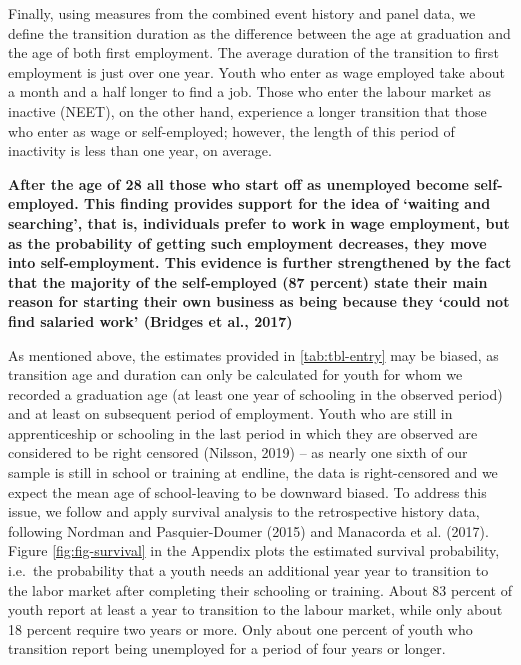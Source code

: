 \documentclass[
  11pt,
a4paper
]{article}
\begin{document}
Finally, using measures from the combined event history and panel data, we define the transition duration as the difference between the age at graduation and the age of both first employment. The average duration of the transition to first employment is just over one year. Youth who enter as wage employed take about a month and a half longer to find a job. Those who enter the labour market as inactive (NEET), on the other hand, experience a longer transition that those who enter as wage or self-employed; however, the length of this period of inactivity is less than one year, on average.

\textbf{After the age of 28 all those who start off as unemployed become self-employed. This finding provides support for the idea of `waiting and searching', that is, individuals prefer to work in wage employment, but as the probability of getting such employment decreases, they move into self-employment. This evidence is further strengthened by the fact that the majority of the self-employed (87 percent) state their main reason for starting their own business as being because they `could not find salaried work' (Bridges et al., 2017)}

As mentioned above, the estimates provided in \ref{tab:tbl-entry} may be biased, as transition age and duration can only be calculated for youth for whom we recorded a graduation age (at least one year of schooling in the observed period) and at least on subsequent period of employment. Youth who are still in apprenticeship or schooling in the last period in which they are observed are considered to be right censored (Nilsson, 2019) -- as nearly one sixth of our sample is still in school or training at endline, the data is right-censored and we expect the mean age of school-leaving to be downward biased. To address this issue, we follow and apply survival analysis to the retrospective history data, following Nordman and Pasquier-Doumer (2015) and Manacorda et al. (2017). Figure \ref{fig:fig-survival} in the Appendix plots the estimated survival probability, i.e.~the probability that a youth needs an additional year year to transition to the labor market after completing their schooling or training. About 83 percent of youth report at least a year to transition to the labour market, while only about 18 percent require two years or more. Only about one percent of youth who transition report being unemployed for a period of four years or longer.
\end{document}
